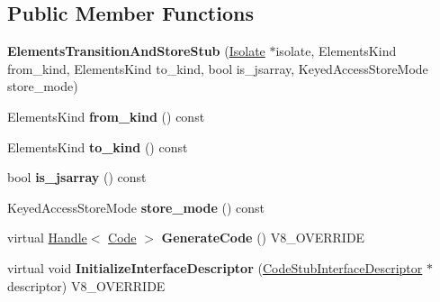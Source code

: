 \subsection*{Public Member Functions}
\begin{DoxyCompactItemize}
\item 
\hypertarget{classv8_1_1internal_1_1_elements_transition_and_store_stub_ace3e5e07d0a87fbf0b5afc2d0585009f}{}{\bfseries Elements\+Transition\+And\+Store\+Stub} (\hyperlink{classv8_1_1internal_1_1_isolate}{Isolate} $\ast$isolate, Elements\+Kind from\+\_\+kind, Elements\+Kind to\+\_\+kind, bool is\+\_\+jsarray, Keyed\+Access\+Store\+Mode store\+\_\+mode)\label{classv8_1_1internal_1_1_elements_transition_and_store_stub_ace3e5e07d0a87fbf0b5afc2d0585009f}

\item 
\hypertarget{classv8_1_1internal_1_1_elements_transition_and_store_stub_af81fb9add5f200ab96a5aefc16539d5d}{}Elements\+Kind {\bfseries from\+\_\+kind} () const \label{classv8_1_1internal_1_1_elements_transition_and_store_stub_af81fb9add5f200ab96a5aefc16539d5d}

\item 
\hypertarget{classv8_1_1internal_1_1_elements_transition_and_store_stub_a84cfb3c4c43c0ebbf5e70d6078034bd5}{}Elements\+Kind {\bfseries to\+\_\+kind} () const \label{classv8_1_1internal_1_1_elements_transition_and_store_stub_a84cfb3c4c43c0ebbf5e70d6078034bd5}

\item 
\hypertarget{classv8_1_1internal_1_1_elements_transition_and_store_stub_afba39f4b23e594f88a086d5b12be7849}{}bool {\bfseries is\+\_\+jsarray} () const \label{classv8_1_1internal_1_1_elements_transition_and_store_stub_afba39f4b23e594f88a086d5b12be7849}

\item 
\hypertarget{classv8_1_1internal_1_1_elements_transition_and_store_stub_a47df304f041db24143bad998472cfafd}{}Keyed\+Access\+Store\+Mode {\bfseries store\+\_\+mode} () const \label{classv8_1_1internal_1_1_elements_transition_and_store_stub_a47df304f041db24143bad998472cfafd}

\item 
\hypertarget{classv8_1_1internal_1_1_elements_transition_and_store_stub_acdb8b8d0525f600175d7d67403da152a}{}virtual \hyperlink{classv8_1_1internal_1_1_handle}{Handle}$<$ \hyperlink{classv8_1_1internal_1_1_code}{Code} $>$ {\bfseries Generate\+Code} () V8\+\_\+\+O\+V\+E\+R\+R\+I\+D\+E\label{classv8_1_1internal_1_1_elements_transition_and_store_stub_acdb8b8d0525f600175d7d67403da152a}

\item 
\hypertarget{classv8_1_1internal_1_1_elements_transition_and_store_stub_a4977ec1bccb3d3e9319bbdf07dab86e2}{}virtual void {\bfseries Initialize\+Interface\+Descriptor} (\hyperlink{classv8_1_1internal_1_1_code_stub_interface_descriptor}{Code\+Stub\+Interface\+Descriptor} $\ast$descriptor) V8\+\_\+\+O\+V\+E\+R\+R\+I\+D\+E\label{classv8_1_1internal_1_1_elements_transition_and_store_stub_a4977ec1bccb3d3e9319bbdf07dab86e2}

\end{DoxyCompactItemize}
